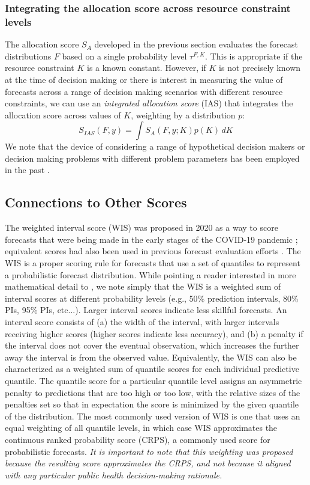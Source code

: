 \documentclass{article}\usepackage[]{graphicx}\usepackage[]{xcolor}
\begin{document}
\subsubsection{Integrating the allocation score across resource constraint levels}{}
\label{sec:methods.detailed.integrated_allocation}

The allocation score $S_A$ developed in the previous section evaluates the forecast distributions
$F$ based on a single probability level $\tau^{F,K}$. This is appropriate if the resource constraint $K$ is a known
constant. However, if $K$ is not precisely known at the time of decision making or there is interest in measuring the
value of forecasts across a range of decision making scenarios with different resource constraints, we can use an
\emph{integrated allocation score} (IAS) that integrates the allocation score across values of $K$, weighting by a
distribution $p$:
$$S_{IAS}(F, y) = \int S_A(F,y; K) p(K) \, dK$$
We note that the device of considering a range of hypothetical decision makers or decision making problems with
different problem parameters has been employed in the past \cite[e.g.,][]{murphy1993whatisagoodforecast}.

\subsection{Connections to Other Scores}
\label{sec:methods.related}

The weighted interval score (WIS) was proposed in 2020 as a way to score forecasts that were being made in the early
stages of the COVID-19 pandemic \citep{bracher2021evaluating}; equivalent scores had also been used in previous forecast
evaluation efforts \cite[e.g.,][]{hong2016probabilisticEnergyForecasting}. The WIS is a proper scoring rule for
forecasts that use a set of quantiles to represent a probabilistic forecast distribution. While pointing a reader
interested in more mathematical detail to \cite{bracher2021evaluating}, we note simply that the WIS is a weighted sum of
interval scores at different probability levels (e.g., 50\% prediction intervals, 80\% PIs, 95\% PIs, etc...). Larger
interval scores indicate less skillful forecasts. An interval score consists of (a) the width of the interval, with
larger intervals receiving higher scores (higher scores indicate less accuracy), and (b) a penalty if the interval does
not cover the eventual observation, which increases the further away the interval is from the observed value.
Equivalently, the WIS can also be characterized as a weighted sum of quantile scores for each individual predictive
quantile. The quantile score for a particular quantile level assigns an asymmetric penalty to predictions that are too
high or too low, with the relative sizes of the penalties set so that in expectation the score is minimized by the given
quantile of the distribution. The most commonly used version of WIS is one that uses an equal weighting of all quantile
levels, in which case WIS approximates the continuous ranked probability score (CRPS), a commonly used score for
probabilistic forecasts. \emph{It is important to note that this weighting was proposed because the resulting score
approximates the CRPS, and not because it aligned with any particular public health decision-making rationale.}
\end{document}
